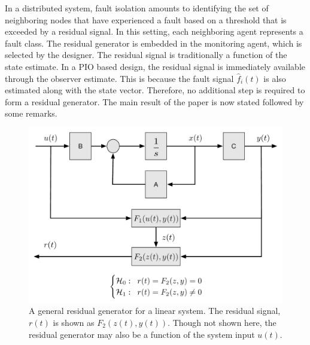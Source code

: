\documentclass[letterpaper, 11 pt, conference]{ieeeconf}  %
\begin{document}
In a distributed system, fault isolation amounts to identifying the set of neighboring nodes that have experienced a fault based on a threshold that is exceeded by a residual signal. In this setting, each neighboring agent represents a fault class. The residual generator is embedded in the monitoring agent, which is selected by the designer. The residual signal is traditionally a function of the state estimate. In a PIO based design, the residual signal is immediately available through the observer estimate. This is because the fault signal $\hat{f}_i (t)$ is also estimated along with the state vector. Therefore, no additional step is required to form a residual generator. The main result of the paper is now stated followed by some remarks. 
\begin{figure}
    \centering
    \includegraphics[scale=0.4]{images/FDIframework.pdf}
    \caption{A general residual generator for a linear system. The residual signal, $r(t)$ is shown as $F_2(z(t),y(t))$. Though not shown here, the residual generator may also be a function of the system input $u(t)$.}
    \label{fig:GenericFDIFramework}
\end{figure}
\end{document}
